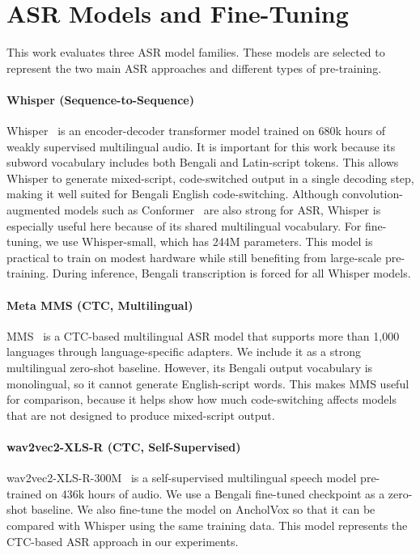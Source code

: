\documentclass[journal]{IEEEtran}
\begin{document}
\section{ASR Models and Fine-Tuning}
\label{sec:models}
This work evaluates three ASR model families. These models are selected to represent the two main ASR approaches and different types of pre-training.


\paragraph*{Whisper (Sequence-to-Sequence)}

Whisper~\cite{radford2023whisper} is an encoder-decoder transformer model trained on 680k hours of weakly supervised multilingual audio. It is important for this work because its subword vocabulary includes both Bengali and Latin-script tokens. This allows Whisper to generate mixed-script, code-switched output in a single decoding step, making it well suited for Bengali English code-switching. Although convolution-augmented models such as Conformer~\cite{gulati2020conformer} are also strong for ASR, Whisper is especially useful here because of its shared multilingual vocabulary. For fine-tuning, we use Whisper-small, which has 244M parameters. This model is practical to train on modest hardware while still benefiting from large-scale pre-training. During inference, Bengali transcription is forced for all Whisper models.

\paragraph*{Meta MMS (CTC, Multilingual)}

MMS~\cite{pratap2024mms} is a CTC-based multilingual ASR model that supports more than 1{,}000 languages through language-specific adapters. We include it as a strong multilingual zero-shot baseline. However, its Bengali output vocabulary is monolingual, so it cannot generate English-script words. This makes MMS useful for comparison, because it helps show how much code-switching affects models that are not designed to produce mixed-script output.


\paragraph*{wav2vec2-XLS-R (CTC, Self-Supervised)}

wav2vec2-XLS-R-300M~\cite{babu2022xlsr} is a self-supervised multilingual speech model pre-trained on 436k hours of audio. We use a Bengali fine-tuned checkpoint as a zero-shot baseline. We also fine-tune the model on AncholVox so that it can be compared with Whisper using the same training data. This model represents the CTC-based ASR approach in our experiments.
\end{document}
